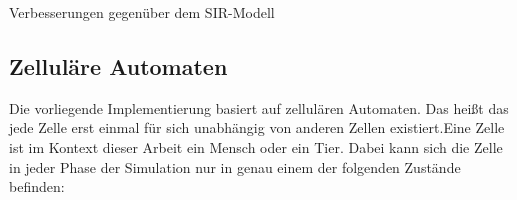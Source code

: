 Verbesserungen gegenüber dem SIR-Modell

\subsection{Zelluläre Automaten}
Die vorliegende Implementierung basiert auf zellulären Automaten. Das heißt das jede Zelle erst einmal für sich unabhängig von anderen Zellen existiert.Eine Zelle ist im Kontext dieser Arbeit ein Mensch oder ein Tier. Dabei kann sich die Zelle in jeder Phase der Simulation nur in genau einem der folgenden Zustände befinden:
